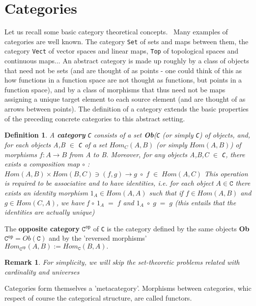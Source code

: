 \documentclass[preprint, 5p, 10pt]{elsarticle}
\theoremstyle{plain}
\newtheorem{remark}[theorem]{Remark}
\newtheorem{definition}[theorem]{Definition}
\begin{document}
\section{Categories}\label{Categories}
Let us recall some basic category theoretical concepts.~\cite{CategoryTheory}
 Many examples of categories are well known. The category \texttt{Set} of sets and maps between them,
the category \texttt{Vect} of vector spaces and linear maps, \texttt{Top} of topological spaces and 
continuous maps... An abstract category is made up roughly by a class of objects that need not be sets (and
are thought of as points - one could think of this as how functions in a function space are not thought as
functions, but points in a function space), and by a class of morphisms that thus need not be
 maps assigning a unique target element to each source element (and are thought of as arrows between points). 
The definition
of a category extends the basic properties of the preceding concrete categories to this abstract setting. 
\begin{definition} 
 A \textbf{category} \texttt{C} consists of a set \textbf{Ob}(\texttt{C} (or simply \texttt{C})
of objects, and, for each objects A,B $\in$ \texttt{C} of a set $Hom_{C}(A,B)$ (or simply $Hom(A,B)$)
of morphisms $f: A \rightarrow B$ from A to B. Moreover, for any objects A,B,C $\in$ \texttt{C}, there 
exists a composition map $\circ$ : $Hom(A,B) \times Hom(B,C) \ni (f,g) \rightarrow g\;\circ\;f\;
\in\;Hom(A,C)$
This operation is required to be associative and to have identities, i.e. for each object 
$A \in \mathtt{C}$ there exists an identity morphism $1_{A} \in Hom(A,A)$ such that if $f \in Hom(A,B)$
and $g \in Hom(C,A)$, we have f $\circ$ $1_{A}\;=\;f$ and $1_{A}\;\circ\;g\;=\;g$ (this entails that the identities
are actually unique)

\end{definition}
The \textbf{opposite category} $\mathtt{C^{op}}$ of \texttt{C} is the category defined by the same objects
\textbf{Ob}$\mathtt{C^{op}}=Ob(\mathtt{C})$ and by the 'reversed morphisms' $Hom_{\mathtt{C^{op}}}(A,B):=
Hom_{\mathtt{C}}(B,A).$
\begin{remark}
 For simplicity, we will skip the set-theoretic problems related with cardinality and universes~\cite{CategoryTheory}
\end{remark}
Categories form themselves a 'metacategory'. Morphisms between categories, whic respect of course
the categorical structure, are called functors. 
\end{document}
